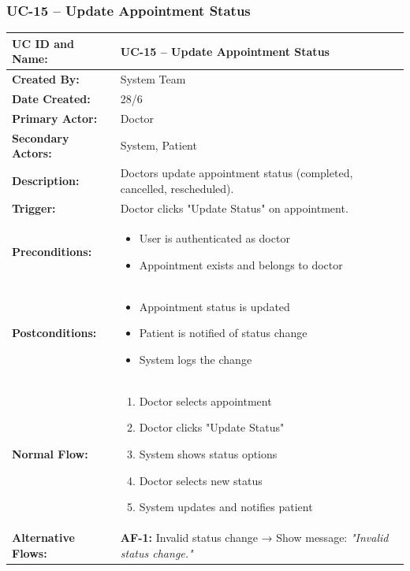 \documentclass[12pt,a4paper]{article}
\begin{document}
\subsubsection{UC-15 – Update Appointment Status}

\renewcommand{\arraystretch}{1.5}
\begin{longtable}{|p{4.5cm}|p{10.5cm}|}
\hline
\textbf{UC ID and Name:} & UC-15 – Update Appointment Status \\
\hline
\textbf{Created By:} & System Team \\
\hline
\textbf{Date Created:} & 28/6 \\
\hline
\textbf{Primary Actor:} & Doctor \\
\hline
\textbf{Secondary Actors:} & System, Patient \\
\hline
\textbf{Description:} & Doctors update appointment status (completed, cancelled, rescheduled). \\
\hline
\textbf{Trigger:} & Doctor clicks "Update Status" on appointment. \\
\hline
\textbf{Preconditions:} &
\begin{itemize}
  \item User is authenticated as doctor
  \item Appointment exists and belongs to doctor
\end{itemize} \\
\hline
\textbf{Postconditions:} &
\begin{itemize}
  \item Appointment status is updated
  \item Patient is notified of status change
  \item System logs the change
\end{itemize} \\
\hline
\textbf{Normal Flow:} &
\begin{enumerate}
  \item Doctor selects appointment
  \item Doctor clicks "Update Status"
  \item System shows status options
  \item Doctor selects new status
  \item System updates and notifies patient
\end{enumerate} \\
\hline
\textbf{Alternative Flows:} &
\textbf{AF-1:} Invalid status change → Show message: \textit{"Invalid status change."} \\
\hline

\end{longtable}
\end{document}
